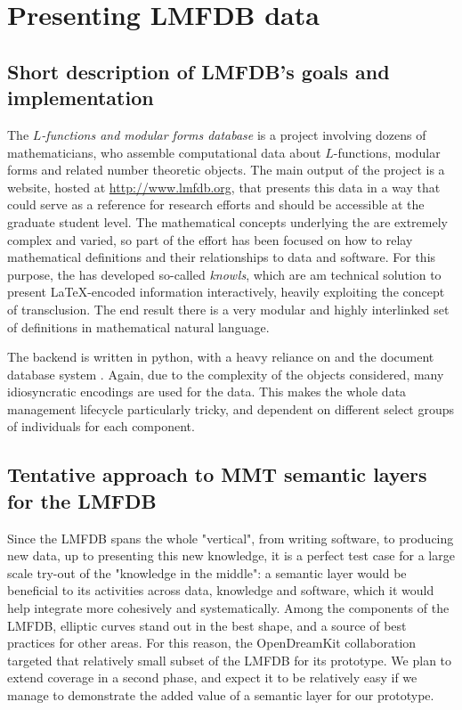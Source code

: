\section{Presenting LMFDB data}
\subsection{Short description of LMFDB's goals and implementation}
The \emph{$L$-functions and modular forms database} is a project involving dozens of  mathematicians, who assemble computational data about $L$-functions, modular  forms and related number theoretic objects. The main output of the project is a website, hosted at \url{http://www.lmfdb.org}, that presents this data in a way that could serve as a reference for research efforts and should be accessible at the graduate student level.  The mathematical concepts underlying the \LMFDB are extremely complex and varied, so part of the effort has been focused on how to relay mathematical definitions and their relationships to data and software. For this purpose, the \LMFDB has developed so-called \emph{knowls}, which are am technical solution to present \LaTeX-encoded information interactively, heavily exploiting the concept of transclusion. The end result there is a very modular and highly interlinked set of definitions in mathematical natural language. 
 
The \LMFDB backend is written in \textsf{python}, with a heavy reliance on \Sage and the document database system \Mongo \cite{lmfdb-repo}. Again, due to the complexity of the objects considered, many idiosyncratic encodings are used for the data. This makes the whole data management lifecycle particularly tricky, and dependent on different select groups of individuals for each component. 

\subsection{Tentative approach to MMT semantic layers for the LMFDB}
Since the LMFDB spans the whole "vertical", from writing software, to producing new data, up to presenting this new knowledge,  it is a perfect test case for a large scale try-out of the "knowledge in the middle": a semantic layer would be beneficial to its activities across data, knowledge and software, which it would help integrate more cohesively and systematically. Among the components of the LMFDB, elliptic curves stand out in the best shape, and a source of best practices for other areas. For this reason, the OpenDreamKit collaboration targeted that relatively small subset of the LMFDB for its prototype. We plan to extend coverage in a second phase, and expect it to be relatively easy if we manage to demonstrate the added value of a semantic layer for our prototype. 

